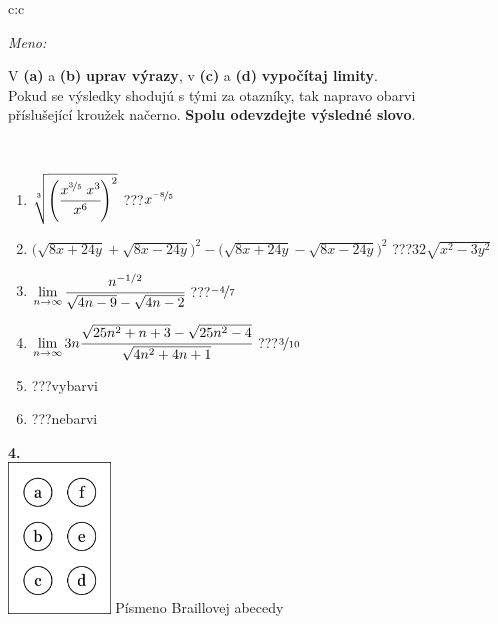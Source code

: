 \documentclass[10pt]{report}
\begin{document}
\begin{tabular}{c:c}
\begin{minipage}[c][104.5mm][t]{0.5\linewidth}
\begin{center}
\textit{Meno:}\phantom{xxxxxxxxxxxxxxxxxxxxxxxxxxxxxxxxxxxxxxxxxxxxxxxxxxxxxxxxxxxxxxxxx}\\[5mm]
\begin{minipage}{0.95\linewidth}
\begin{center}
V \textbf{(a)} a \textbf{(b)} \textbf{uprav výrazy}, v \textbf{(c)} a \textbf{(d)} \textbf{vypočítaj limity}.\\Pokud se výsledky shodujú s tými za otazníky, tak napravo obarvi\\příslušející kroužek načerno. \textbf{Spolu odevzdejte výsledné slovo}.
\end{center}
\end{minipage}
\\[1mm]
\begin{minipage}{0.79\linewidth}
\begin{center}
\begin{varwidth}{\linewidth}
\begin{enumerate}
\small
\item $\sqrt[3]{\left(\cfrac{x^{\nicefrac{3}{5}}\;x^{3}}{x^{6}}\right)^{2}}$\quad \dotfill\; ???\;\dotfill \quad $x^{\nicefrac{-8}{5}}$
\item {\footnotesize{\scriptsize$\big(\sqrt{8x+24y}+\sqrt{8x-24y}\big)^2-\big(\sqrt{8x+24y}-\sqrt{8x-24y}\big)^2$}\quad \dotfill\; ???\;\dotfill \quad $32\sqrt{x^2-3y^2}$}
\item $\lim\limits_{n\to\infty}\cfrac{n^{-1/2}}{\sqrt{4n-9}-\sqrt{4n-2}}$\quad \dotfill\; ???\;\dotfill \quad $\nicefrac{-4}{7}$
\item $\lim\limits_{n\to\infty}3n\cfrac{\sqrt{25n^2+n+3}-\sqrt{25n^2-4}}{\sqrt{4n^2+4n+1}}$\quad \dotfill\; ???\;\dotfill \quad $\nicefrac{3}{10}$
\item \quad \dotfill\; ???\;\dotfill \quad vybarvi
\item \quad \dotfill\; ???\;\dotfill \quad nebarvi
\end{enumerate}
\end{varwidth}
\end{center}
\end{minipage}
\begin{minipage}{0.20\linewidth}
\begin{center}
{\Huge\bfseries 4.} \\[2mm]
\includegraphics[height=40mm]{../images/braille.png}
{\small Písmeno Braillovej abecedy}
\end{center}
\end{minipage}
\end{center}
\end{minipage}
%
\end{tabular}
\end{document}
